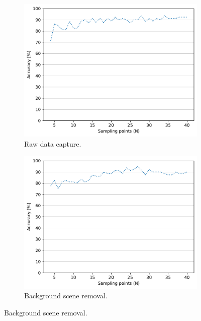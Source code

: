 \begin{figure}[tbp]
    \begin{subfigure}{.49\textwidth}
        \centering
        \includegraphics[width=.99\linewidth]{Figures/RadarExperiments/Datasets/SensorsComparison/Horn/samples-raw.pdf}
        \vspace{-15pt}
        \captionsetup{width=.99\linewidth}
        \caption{Raw data capture.}
        \label{fig:radar-experiments:sensors:horn-samples:raw}
    \end{subfigure}
    \begin{subfigure}{.49\textwidth}
        \centering
        \includegraphics[width=.99\linewidth]{Figures/RadarExperiments/Datasets/SensorsComparison/Horn/samples-bgsub.pdf}  
        \vspace{-15pt}
        \captionsetup{width=.99\linewidth}
        \caption{Background scene removal.}
        \label{fig:radar-experiments:sensors:horn-samples:bgsub}
    \end{subfigure}
    

\end{figure}
